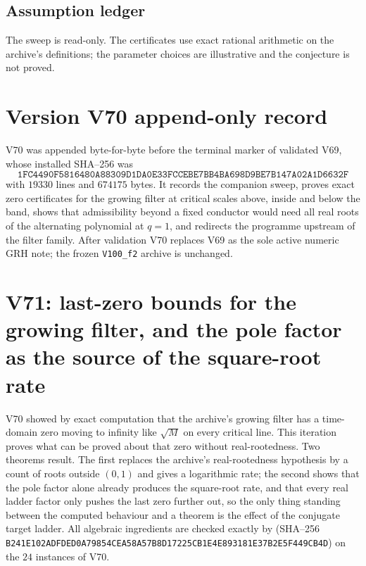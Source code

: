 \documentclass[11pt]{article}
\theoremstyle{definition}
\theoremstyle{remark}
\begin{document}
\subsection*{Assumption ledger}
\label{ass:f2v70}
The sweep is read-only.  The certificates use exact rational arithmetic
on the archive's definitions; the parameter choices are illustrative and
the conjecture is not proved.
\endgroup

\section*{Version V70 append-only record}

V70 was appended byte-for-byte before the terminal marker of validated
V69, whose installed SHA--256 was
\[
 \texttt{1FC4490F5816480A88309D1DA0E33FCC}
 \allowbreak\texttt{EBE7BB4BA698D9BE7B147A02A1D6632F}
\]
with \(19330\) lines and \(674175\) bytes.  It records the companion
sweep, proves exact zero certificates for the growing filter at critical
scales above, inside and below the band, shows that admissibility beyond
a fixed conductor would need all real roots of the alternating polynomial
at \(q=1\), and redirects the programme upstream of the filter family.
After validation V70 replaces V69 as the sole active numeric GRH note;
the frozen \texttt{V100\_f2} archive is unchanged.





\clearpage
\section{V71: last-zero bounds for the growing filter, and the pole factor as the source of the square-root rate}
\label{sec:f2v71-last-zero}
\begingroup
\setcounter{equation}{0}
\renewcommand{\theequation}{N71.\arabic{equation}}
\renewcommand{\theHequation}{f2v71.\arabic{equation}}

V70 showed by exact computation that the archive's growing filter has a
time-domain zero moving to infinity like \(\sqrt M\) on every critical
line.  This iteration proves what can be proved about that zero without
real-rootedness.  Two theorems result.  The first replaces the archive's
real-rootedness hypothesis by a count of roots outside \((0,1)\) and
gives a logarithmic rate; the second shows that the pole factor alone
already produces the square-root rate, and that every real ladder factor
only pushes the last zero further out, so the only thing standing between
the computed behaviour and a theorem is the effect of the conjugate
target ladder.  All algebraic ingredients are checked exactly by
 (SHA--256
\texttt{B241E102ADFDED0A79854CEA58A57B8D}\allowbreak\texttt{17225CB1E4E893181E37B2E5F449CB4D}) on the \(24\) instances of
V70.
\end{document}
